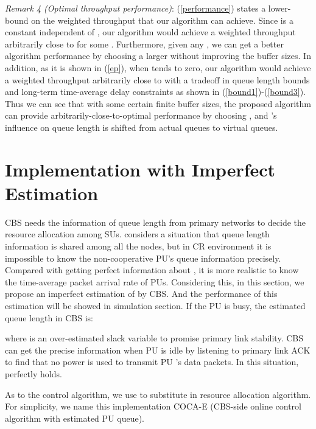 \documentclass[journal]{IEEEtran}
\begin{document}
\emph{Remark 4 (Optimal throughput performance)}: (\ref{performance}) states a lower-bound on the weighted throughput that
our algorithm can achieve. Since  is a constant independent of , our algorithm would achieve a weighted throughput
arbitrarily close to  for some .
Furthermore, given any , we can get a better algorithm performance by choosing a larger  without
improving the  buffer sizes. In addition, as it is shown in (\ref{ep}), when  tends to zero, our algorithm would
achieve a weighted throughput arbitrarily close to  with a
tradeoff
in queue length bounds and long-term time-average delay constraints as shown in (\ref{bound1})-(\ref{bound3}). Thus we can see that
with some certain finite buffer sizes, the proposed algorithm can provide arbitrarily-close-to-optimal performance by choosing
, and 's influence on queue length is shifted from actual queues to virtual queues.

\section{Implementation with Imperfect Estimation}
CBS needs the information of queue length from primary networks to decide the resource allocation among SUs.
\cite{georgiadis2006resource} considers a situation that queue length information is shared among all the nodes, but in
CR environment it is impossible to know the non-cooperative PU's queue information precisely. Compared with
getting perfect information about , it is more realistic to know the time-average packet arrival rate of PUs.
Considering this,
in this section, we propose an imperfect estimation of  by CBS. And the performance of this estimation will be showed
in simulation section. If the PU  is busy, the estimated queue length in CBS is:

where  is an over-estimated slack variable to promise primary link stability. CBS can get the precise information
when PU is idle by listening to primary link ACK to find that no power is used to transmit PU 's data packets. In this
situation,  perfectly holds.

As to the control algorithm, we use  to substitute  in resource allocation algorithm. For simplicity, we
name this implementation COCA-E (CBS-side online control algorithm with estimated PU queue).
\end{document}
